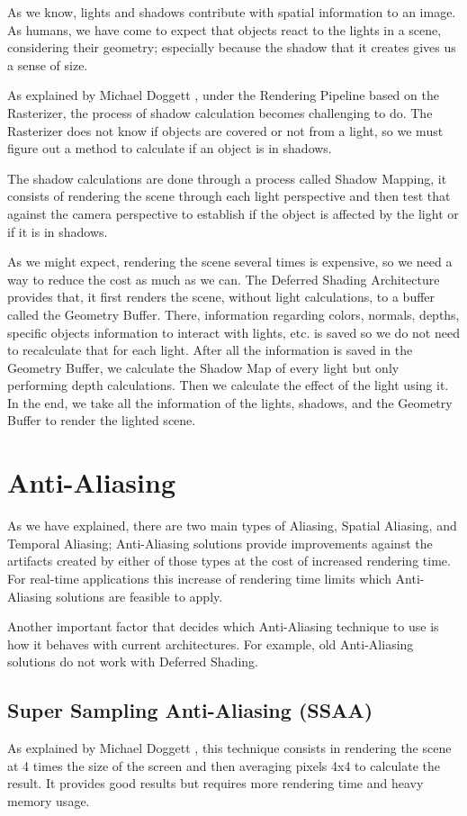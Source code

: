 \documentclass{cslthse-msc}
\begin{document}
As we know, lights and shadows contribute with spatial information to an image. As humans, we have come to expect that objects react to the lights in a scene, considering their geometry; especially because the shadow that it creates gives us a sense of size.

As explained by Michael Doggett \cite{Doggett2017EDAN35}, under the Rendering Pipeline based on the Rasterizer, the process of shadow calculation becomes challenging to do. The Rasterizer does not know if objects are covered or not from a light, so we must figure out a method to calculate if an object is in shadows. 

The shadow calculations are done through a process called Shadow Mapping, it consists of rendering the scene through each light perspective and then test that against the camera perspective to establish if the object is affected by the light or if it is in shadows.

As we might expect, rendering the scene several times is expensive, so we need a way to reduce the cost as much as we can. The Deferred Shading Architecture provides that, it first renders the scene, without light calculations, to a buffer called the Geometry Buffer. There, information regarding colors, normals, depths, specific objects information to interact with lights, etc. is saved so we do not need to recalculate that for each light. After all the information is saved in the Geometry Buffer, we calculate the Shadow Map of every light but only performing depth calculations. Then we calculate the effect of the light using it. In the end, we take all the information of the lights, shadows, and the Geometry Buffer to render the lighted scene.


\section{Anti-Aliasing}
As we have explained, there are two main types of Aliasing, Spatial Aliasing, and Temporal Aliasing; Anti-Aliasing solutions provide improvements against the artifacts created by either of those types at the cost of increased rendering time. For real-time applications this increase of rendering time limits which Anti-Aliasing solutions are feasible to apply.

Another important factor that decides which Anti-Aliasing technique to use is how it behaves with current architectures. For example, old Anti-Aliasing solutions do not work with Deferred Shading.

\subsection{Super Sampling Anti-Aliasing (SSAA)}
As explained by Michael Doggett \cite{Doggett2017EDAN35}, this technique consists in rendering the scene at 4 times the size of the screen and then averaging pixels 4x4 to calculate the result. It provides good results but requires more rendering time and heavy memory usage.
\end{document}
